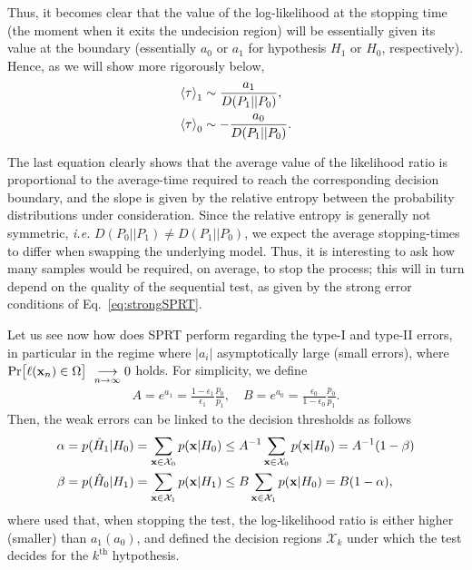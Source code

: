 Thus, it becomes clear that the value of the log-likelihood at the stopping time (the moment when it exits the undecision region) will be essentially given its value at the boundary (essentially $a_{0}$ or $a_{1}$ for hypothesis $H_{1}$ or $H_{0}$, respectively). Hence, as we will show more rigorously below,
\begin{align}\label{eq:waldsolved}
\mathinner{\langle \tau\rangle}_{1} &\sim \frac{a_{1}}{D(P_1||P_0)}, \\
\mathinner{\langle \tau\rangle}_{0} &\sim -\frac{a_{0}}{D(P_1||P_0)}.
\end{align}

The last equation clearly shows that the average value of the likelihood ratio is proportional to the average-time required to reach the corresponding decision boundary, and the slope is given by the relative entropy between the probability distributions under consideration. Since the relative entropy is generally not symmetric, \textit{i.e.} $D(P_0||P_1)\neq D(P_1||P_0)$, we expect the average stopping-times to differ when swapping the underlying model. Thus, it is interesting to ask how many samples would be required, on average, to stop the process; this will in turn depend on the quality of the sequential test, as given by the strong error conditions of Eq.~\ref{eq:strongSPRT}.

Let us see now how does SPRT perform regarding the type-I and type-II errors, in particular in the regime where $|a_{i}|$ asymptotically large (small errors), where  $\text{Pr}\big[\ell(\xf_n) \in \Omega\big] \underset{n\rightarrow\infty}{\longrightarrow}0$ holds. For simplicity, we define
\begin{align*}
A = e^{a_1} = \frac{1-\epsilon_1}{\epsilon_1} \frac{p_0}{p_1}, \quad B =e^{a_0} =  \frac{\epsilon_0}{1-\epsilon_0} \frac{p_0}{p_1}.
\end{align*}
Then, the weak errors can be linked to the decision thresholds as follows
\begin{align}
\alpha &= p(\hat{H}_1|H_0) = \sum_{\mathbf{x} \in \mathbf{\mathcal{X}}_0} p(\mathbf{x}|H_0) \leq A^{-1}  \sum_{\mathbf{x} \in \mathbf{\mathcal{X}}_0} p(\mathbf{x}|H_0) = A^{-1}(1-\beta)\\
\beta &= p(\hat{H}_0|H_1) = \sum_{\mathbf{x} \in \mathbf{\mathcal{X}}_1} p(\mathbf{x}|H_1)\leq B \sum_{\mathbf{x} \in \mathbf{\mathcal{X}}_1} p(\mathbf{x}|H_0) = B (1-\alpha),
\end{align}
where used that, when stopping the test, the log-likelihood ratio is either higher (smaller) than $a_1(a_0)$, and defined the decision regions $\mathbf{\mathcal{X}}_k$ under which the test decides for the $k^\text{th}$ hytpothesis.

